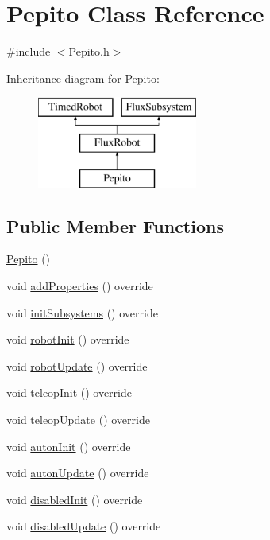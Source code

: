 \hypertarget{classPepito}{}\section{Pepito Class Reference}
\label{classPepito}


{\ttfamily \#include $<$Pepito.\+h$>$}

Inheritance diagram for Pepito\+:\begin{figure}[H]
\begin{center}
\leavevmode
\includegraphics[height=3.000000cm]{classPepito}
\end{center}
\end{figure}
\subsection*{Public Member Functions}
\begin{DoxyCompactItemize}
\item 
\hyperlink{classPepito_a5cfed0e7fc2f459c9dd983e44f46ae53}{Pepito} ()
\item 
void \hyperlink{classPepito_a1368f048f197d9b0e3a7e710dd4809fc}{add\+Properties} () override
\item 
void \hyperlink{classPepito_a420a3322a1fa658e9e40f277e7cc1c03}{init\+Subsystems} () override
\item 
void \hyperlink{classPepito_a1eed9bef768f3694d8bdfb4f610b8e3a}{robot\+Init} () override
\item 
void \hyperlink{classPepito_a0894a64d02550bb35b4e3eefa3ac4934}{robot\+Update} () override
\item 
void \hyperlink{classPepito_a5001bee2d7dcc225c87ac36d5eddc452}{teleop\+Init} () override
\item 
void \hyperlink{classPepito_ac19e921b35d2d76cb5b6a2105b26f568}{teleop\+Update} () override
\item 
void \hyperlink{classPepito_ac9a8b75ef48cd95683733af317618ca4}{auton\+Init} () override
\item 
void \hyperlink{classPepito_a42cc57495399c63940571b113e7140f8}{auton\+Update} () override
\item 
void \hyperlink{classPepito_a04a85eae33c653f9555b6db43d50b210}{disabled\+Init} () override
\item 
void \hyperlink{classPepito_afc29a2b7ac94a47381ca213dc2993c39}{disabled\+Update} () override
\end{DoxyCompactItemize}
